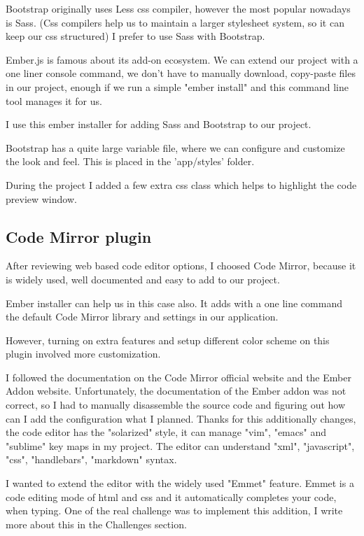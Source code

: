 \documentclass[12pt, a4paper, oneside, openright, medskipamount]{report}
\begin{document}
Bootstrap originally uses Less \cite{less} css compiler, however the most popular nowadays is Sass\cite{sass}. (Css compilers help us to maintain a larger stylesheet system, so it can keep our css structured) I prefer to use Sass with Bootstrap.

Ember.js is famous about its add-on ecosystem. We can extend our project with a one liner console command, we don't have to manually download, copy-paste files in our project, enough if we run a simple "ember install" and this command line tool manages it for us.

I use this ember installer for adding Sass and Bootstrap to our project.

Bootstrap has a quite large variable file, where we can configure and customize the look and feel. This is placed in the 'app/styles' folder.

During the project I added a few extra css class which helps to highlight the code preview window.

\subsection{Code Mirror plugin} \label{codemirror}

After reviewing web based code editor options, I choosed Code Mirror, because it is widely used, well documented and easy to add to our project.

Ember installer can help us in this case also. It adds with a one line command the default Code Mirror library and settings in our application.

However, turning on extra features and setup different color scheme on this plugin involved more customization.

I followed the documentation on the Code Mirror official website and the Ember Addon website. Unfortunately, the documentation of the Ember addon was not correct, so I had to manually disassemble the source code and figuring out how can I add the configuration what I planned. Thanks for this additionally changes, the code editor has the "solarized" style, it can manage "vim", "emacs" and "sublime" key maps in my project. The editor can understand "xml", "javascript", "css", "handlebars", "markdown" syntax.

I wanted to extend the editor with the widely used "Emmet" feature. Emmet is a code editing mode of html and css and it automatically completes your code, when typing. One of the real challenge was to implement this addition, I write more about this in the Challenges section.
\end{document}
